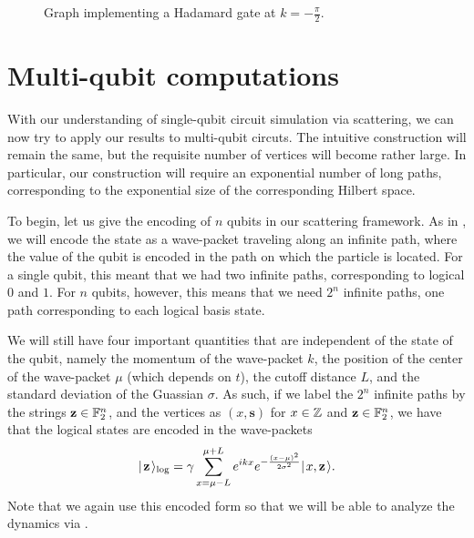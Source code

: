 \documentclass[../thesis-main/thesis-main]{subfiles}
\begin{document}
\begin{figure}
  \centering
  
  \caption{Graph implementing a Hadamard gate at $k = -\frac{\pi}{2}$.
    \label{fig:pi_2_had}}
\end{figure}



\section{Multi-qubit computations}
\label{sec:multi_qubit_computations}

With our understanding of single-qubit circuit simulation via scattering, we can now try to apply our results to multi-qubit circuts.  The intuitive construction will remain the same, but the requisite number of vertices will become rather large.  In particular, our construction will require an exponential number of long paths, corresponding to the exponential size of the corresponding Hilbert space.

To begin, let us give the encoding of $n$ qubits in our scattering framework.  As in , we will encode the state as a wave-packet traveling along an infinite path, where the value of the qubit is encoded in the path on which the particle is located.  For a single qubit, this meant that we had two infinite paths, corresponding to logical $0$ and $1$.  For $n$ qubits, however, this means that we need $2^n$ infinite paths, one path corresponding to each logical basis state.

We will still have four important quantities that are independent of the state of the qubit, namely the momentum of the wave-packet $k$, the position of the center of the wave-packet $\mu$ (which depends on $t$), the cutoff distance $L$, and the standard deviation of the Guassian $\sigma$.  As such, if we label the $2^n$ infinite paths by the strings $\mathbf{z}\in \mathbb{F}_2^n$, and the vertices as $(x,\mathbf{s})$ for $x\in \mathbb{Z}$ and $\mathbf{z}\in \mathbb{F}_2^n$, we have that the logical states are encoded in the wave-packets
\begin{align}
  |\mspace{2mu} \mathbf{z} \mspace{2mu} \rangle_{\text{log}} = \gamma \sum_{x = \mu - L}^{\mu + L} e^{ i k x} e^{ - \frac{(x-\mu)^2}{2\sigma^2}} |\mspace{2mu} x,\mathbf{z} \mspace{2mu} \rangle \label{eq:multi_qubit_encoding}.
\end{align}
Note that we again use this encoded form so that we will be able to analyze the dynamics via .
\end{document}

